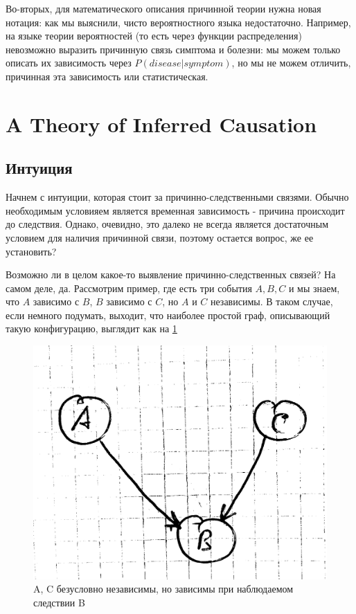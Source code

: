 \documentclass[fleqn]{article}
\begin{document}
Во-вторых, для математического описания причинной теории нужна новая нотация: как мы выяснили, чисто вероятностного языка недостаточно. Например, на языке теории вероятностей (то есть через функции распределения) невозможно выразить причинную связь симптома и болезни: мы можем только описать их зависимость через $P(disease | symptom)$, но мы не можем отличить, причинная эта зависимость или статистическая.

\section*{A Theory of Inferred Causation}

\subsection*{Интуиция}
Начнем с интуиции, которая стоит за причинно-следственными связями. Обычно необходимым условияем является временная зависимость - причина происходит до следствия. Однако, очевидно, это далеко не всегда является достаточным условием для наличия причинной связи, поэтому остается вопрос, же ее установить?

Возможно ли в целом какое-то выявление причинно-следственных связей? На самом деле, да. Рассмотрим пример, где есть три события $A, B, C$ и мы знаем, что $A$ зависимо с $B$, $B$ зависимо с $C$, но $A$ и $C$ независимы. В таком случае, если немного подумать, выходит, что наиболее простой граф, описывающий такую конфигурацию, выглядит как на \ref{fig:abc}


\begin{figure}[h]
	\begin{center}
	\includegraphics[scale=0.1]{imgs/img1.png}
	\end{center}
	\caption{A, C безусловно независимы, но зависимы при наблюдаемом следствии B}
	\label{fig:abc}
\end{figure}
\end{document}
